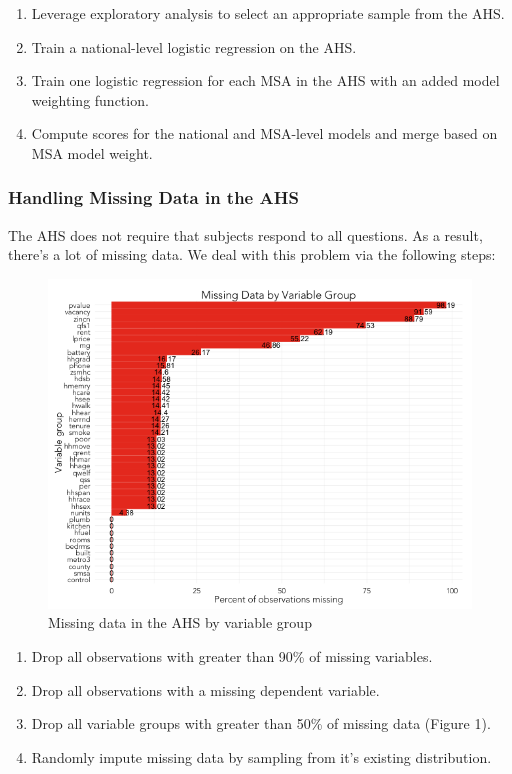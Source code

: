 \documentclass{sig-alternate}
\begin{document}
\begin{enumerate} 
\item Leverage exploratory analysis to select an appropriate sample from the AHS.
\item Train a national-level logistic regression on the AHS.
\item Train one logistic regression for each MSA in the AHS with an added model weighting function.
\item Compute scores for the national and MSA-level models and merge based on MSA model weight.
\end{enumerate}

\subsubsection{Handling Missing Data in the AHS}

The AHS does not require that subjects respond to all questions. As a result, there's a lot of missing data. We deal with this problem via the following steps:

\begin{figure}
\centering 
\includegraphics[scale=0.42]{missing-data-1.png}
\caption{Missing data in the AHS by variable group}
\end{figure}

\begin{enumerate} 
\item Drop all observations with greater than 90\% of missing variables. 
\item Drop all observations with a missing dependent variable.
\item Drop all variable groups with greater than 50\% of missing data (Figure 1).
\item Randomly impute missing data by sampling from it's existing distribution.
\end{enumerate}
\end{document}
